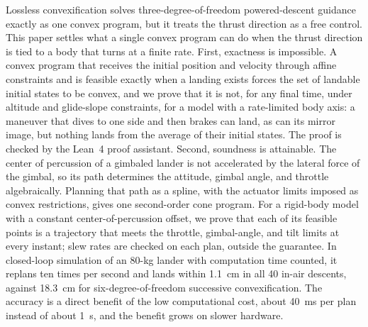 \begin{aiaaabstract}
Lossless convexification solves three-degree-of-freedom powered-descent guidance exactly as one convex program, but it
treats the thrust direction as a free control. This paper settles what a single convex program can do when the thrust
direction is tied to a body that turns at a finite rate. First, exactness is impossible. A convex program that receives the
initial position and velocity through affine constraints and is feasible exactly when a landing exists forces the set of
landable initial states to be convex, and we prove that it is not, for any final time, under altitude and glide-slope
constraints, for a model with a rate-limited body axis: a maneuver that dives to one side and then brakes can land, as can its mirror image, but nothing lands from the
average of their initial states. The proof is checked by the Lean~4 proof assistant. Second, soundness is attainable. The
center of percussion of a gimbaled lander is not accelerated by the lateral force of the gimbal, so its path determines the
attitude, gimbal angle, and throttle algebraically. Planning that path as a spline, with the actuator limits imposed as
convex restrictions, gives one second-order cone program. For a rigid-body model with a constant center-of-percussion
offset, we prove that each of its feasible points is a trajectory that meets the throttle, gimbal-angle, and tilt limits at
every instant; slew rates are checked on each plan, outside the guarantee. In closed-loop simulation of an 80-kg lander with
computation time counted, it replans ten times per second and lands within 1.1~cm in all 40 in-air descents, against
18.3~cm for six-degree-of-freedom successive convexification. The accuracy is a direct benefit of the low computational
cost, about 40~ms per plan instead of about 1~s, and the benefit grows on slower hardware.
\end{aiaaabstract}

